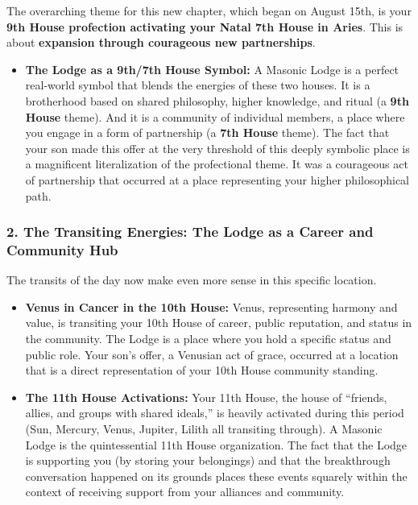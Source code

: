 \documentclass{article}
\begin{document}
The overarching theme for this new chapter, which began on August 15th, is your \textbf{9th House profection activating your Natal 7th House in Aries}. This is about \textbf{expansion through courageous new partnerships}.

\begin{itemize}
\tightlist
\item
  \textbf{The Lodge as a 9th/7th House Symbol:} A Masonic Lodge is a perfect real-world symbol that blends the energies of these two houses. It is a brotherhood based on shared philosophy, higher knowledge, and ritual (a \textbf{9th House} theme). And it is a community of individual members, a place where you engage in a form of partnership (a \textbf{7th House} theme). The fact that your son made this offer at the very threshold of this deeply symbolic place is a magnificent literalization of the profectional theme. It was a courageous act of partnership that occurred at a place representing your higher philosophical path.
\end{itemize}

\subsubsection*{2. The Transiting Energies: The Lodge as a Career and Community Hub}\label{the-transiting-energies-the-lodge-as-a-career-and-community-hub}

The transits of the day now make even more sense in this specific location.

\begin{itemize}
\item
  \textbf{Venus in Cancer in the 10th House:} Venus, representing harmony and value, is transiting your 10th House of career, public reputation, and status in the community. The Lodge is a place where you hold a specific status and public role. Your son's offer, a Venusian act of grace, occurred at a location that is a direct representation of your 10th House community standing.
\item
  \textbf{The 11th House Activations:} Your 11th House, the house of ``friends, allies, and groups with shared ideals,'' is heavily activated during this period (Sun, Mercury, Venus, Jupiter, Lilith all transiting through). A Masonic Lodge is the quintessential 11th House organization. The fact that the Lodge is supporting you (by storing your belongings) and that the breakthrough conversation happened on its grounds places these events squarely within the context of receiving support from your alliances and community.
\end{itemize}
\end{document}
